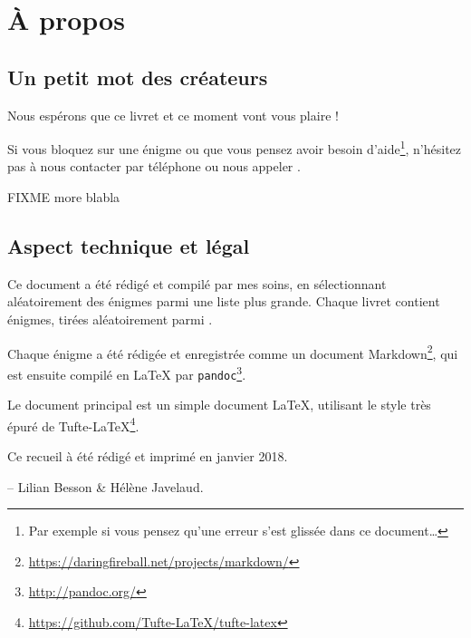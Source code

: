 \chapter{À propos}

\section*{Un petit mot des créateurs}

Nous espérons que ce livret et ce moment vont vous plaire !

Si vous bloquez sur une énigme ou que vous pensez avoir besoin d'aide\footnote{Par exemple si vous pensez qu'une erreur s'est glissée dans ce document…}, n'hésitez pas à nous contacter par téléphone ou nous appeler
.

FIXME more blabla


\section*{Aspect technique et légal}
Ce document a été rédigé et compilé par mes soins, en sélectionnant aléatoirement des énigmes parmi une liste plus grande.
Chaque livret contient \nbenigmes{} énigmes, tirées aléatoirement parmi \totalnbenigmes.

Chaque énigme a été rédigée et enregistrée comme un document Markdown\footnote{\url{https://daringfireball.net/projects/markdown/}},
qui est ensuite compilé en \LaTeX{} par \texttt{pandoc}\footnote{\url{http://pandoc.org/}}.

Le document principal est un simple document \LaTeX,
utilisant le style très épuré de Tufte-\LaTeX{}\footnote{\url{https://github.com/Tufte-LaTeX/tufte-latex}}.

Ce recueil à été rédigé et imprimé en janvier 2018.

-- Lilian Besson \& Hélène Javelaud.